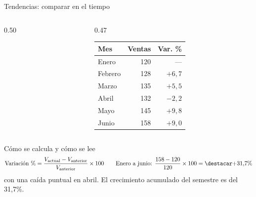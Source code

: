 \documentclass[aspectratio=169,10pt]{beamer}
\begin{document}
\begin{frame}{Tendencias: comparar en el tiempo}
  \footnotesize
  \begin{columns}[T,onlytextwidth]
    \begin{column}{0.50\textwidth}
      \centering
    \end{column}
    \begin{column}{0.47\textwidth}
      \centering\scriptsize
      \begin{tabular}{@{}lrr@{}}
        \toprule
        \textbf{Mes} & \textbf{Ventas} & \textbf{Var. \%} \\
        \midrule
        Enero   & 120 & --- \\
        Febrero & 128 & $+6{,}7$ \\
        Marzo   & 135 & $+5{,}5$ \\
        Abril   & 132 & $-2{,}2$ \\
        Mayo    & 145 & $+9{,}8$ \\
        Junio   & 158 & $+9{,}0$ \\
        \bottomrule
      \end{tabular}
    \end{column}
  \end{columns}

  \vspace{0.1cm}
  \begin{alertblock}{Cómo se calcula y cómo se lee}
    \scriptsize
    \[ \text{Variación \%} = \frac{V_{\text{actual}} - V_{\text{anterior}}}
       {V_{\text{anterior}}} \times 100 \qquad
       \text{Enero a junio: } \frac{158-120}{120}\times100 = \destacar{+31{,}7\%} \]
     con una caída puntual en abril. El crecimiento
    acumulado del semestre es del 31,7\%.
  \end{alertblock}
\end{frame}
\end{document}

